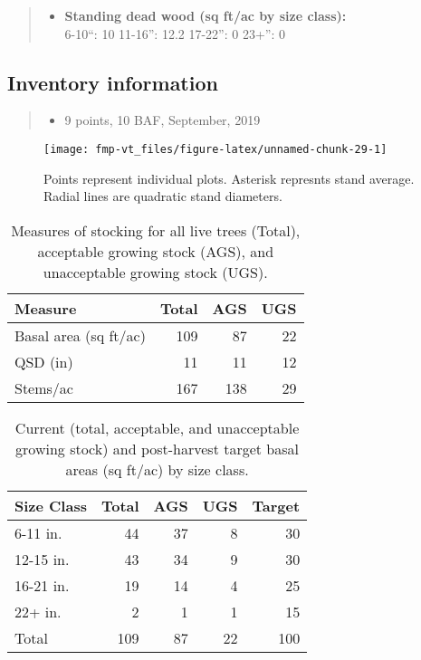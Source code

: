 \documentclass[]{tufte-handout}
\providecommand{\tightlist}{%
  \setlength{\itemsep}{0pt}\setlength{\parskip}{0pt}}
\begin{document}
\begin{quote}
\begin{itemize}
\tightlist
\item
  \textbf{Standing dead wood (sq ft/ac by size class):}\\
  \vspace{2pt} \indent \small 6-10``: 10 \textbar{} 11-16'': 12.2
  \textbar{} 17-22'': 0 \textbar{} 23+'': 0
\end{itemize}
\end{quote}

\subsection{Inventory information}\label{inventory-information-4}

\begin{quote}
\begin{itemize}
\tightlist
\item
  9 points, 10 BAF, September, 2019
\end{itemize}
\end{quote}

\begin{figure}
\texttt{[image: fmp-vt\_files/figure-latex/unnamed-chunk-29-1]} \caption[Points represent individual plots]{Points represent individual plots. Asterisk represnts stand average. Radial lines are quadratic stand diameters.}\label{fig:unnamed-chunk-29}
\end{figure}

\begin{table}

\caption{\label{tab:unnamed-chunk-30}Measures of stocking for all live trees (Total), acceptable growing stock (AGS), and unacceptable growing stock (UGS).}
\centering
\begin{tabular}[t]{lrrr}
\toprule
Measure & Total & AGS & UGS\\
\midrule
Basal area (sq ft/ac) & 109 & 87 & 22\\
QSD (in) & 11 & 11 & 12\\
Stems/ac & 167 & 138 & 29\\
\bottomrule
\end{tabular}
\end{table}

\begin{table}

\caption{\label{tab:unnamed-chunk-31}Current (total, acceptable, and unacceptable growing stock) and post-harvest target basal areas (sq ft/ac) by size class.}
\centering
\begin{tabular}[t]{lrrrr}
\toprule
Size Class & Total & AGS & UGS & Target\\
\midrule
6-11 in. & 44 & 37 & 8 & 30\\
12-15 in. & 43 & 34 & 9 & 30\\
16-21 in. & 19 & 14 & 4 & 25\\
22+ in. & 2 & 1 & 1 & 15\\
Total & 109 & 87 & 22 & 100\\
\bottomrule
\end{tabular}
\end{table}
\end{document}
